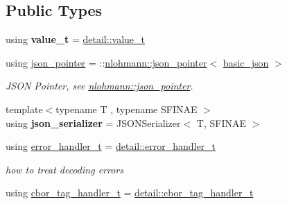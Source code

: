 \subsection*{Public Types}
\begin{DoxyCompactItemize}
\item 
\mbox{\label{classnlohmann_1_1basic__json_ac68cb65a7f3517f0c5b1d3a4967406ad}} 
using {\bfseries value\+\_\+t} = \hyperlink{namespacenlohmann_1_1detail_a1ed8fc6239da25abcaf681d30ace4985}{detail\+::value\+\_\+t}
\item 
\mbox{\label{classnlohmann_1_1basic__json_aa8f1f93b32da01b42413643be32b2c27}} 
using \hyperlink{classnlohmann_1_1basic__json_aa8f1f93b32da01b42413643be32b2c27}{json\+\_\+pointer} = \+::\hyperlink{classnlohmann_1_1json__pointer}{nlohmann\+::json\+\_\+pointer}$<$ \hyperlink{classnlohmann_1_1basic__json}{basic\+\_\+json} $>$
\begin{DoxyCompactList}\small\item\em J\+S\+ON Pointer, see \hyperlink{classnlohmann_1_1json__pointer}{nlohmann\+::json\+\_\+pointer}. \end{DoxyCompactList}\item 
\mbox{\label{classnlohmann_1_1basic__json_ad6ebc5da7ced975bb184133750e7d49f}} 
{\footnotesize template$<$typename T , typename S\+F\+I\+N\+AE $>$ }\\using {\bfseries json\+\_\+serializer} = J\+S\+O\+N\+Serializer$<$ T, S\+F\+I\+N\+AE $>$
\item 
\mbox{\label{classnlohmann_1_1basic__json_a1e7ca76cc3f62626b380be5e18a002d5}} 
using \hyperlink{classnlohmann_1_1basic__json_a1e7ca76cc3f62626b380be5e18a002d5}{error\+\_\+handler\+\_\+t} = \hyperlink{namespacenlohmann_1_1detail_a5a76b60b26dc8c47256a996d18d967df}{detail\+::error\+\_\+handler\+\_\+t}
\begin{DoxyCompactList}\small\item\em how to treat decoding errors \end{DoxyCompactList}\item 
\mbox{\label{classnlohmann_1_1basic__json_a54951d14f0dd10cc3cfdaa24f8bfd15c}} 
using \hyperlink{classnlohmann_1_1basic__json_a54951d14f0dd10cc3cfdaa24f8bfd15c}{cbor\+\_\+tag\+\_\+handler\+\_\+t} = \hyperlink{namespacenlohmann_1_1detail_a58bb1ef1a9ad287a9cfaf1855784d9ac}{detail\+::cbor\+\_\+tag\+\_\+handler\+\_\+t}

\end{DoxyCompactItemize}
